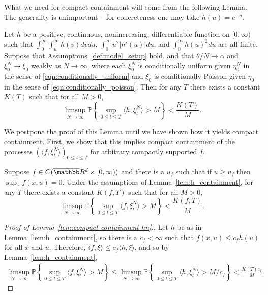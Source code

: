 \documentclass[EJP]{ejpecp} %
\renewcommand{\bar}{\overline}
\newcommand{\IP}{\mathbb P}
\newcommand{\IR}{\mathbb R}
\newcommand{\lp}{\xi}              %
\begin{document}
What we need for compact containment will come from the following Lemma.
The generality is unimportant --
for concreteness one may take $h(u) = e^{-u}$.

\begin{lemma}
        \label{lem:h_containment}
    Let $h$ be a positive, continuous, nonincreasing, differentiable function on $[0, \infty)$
    such that
    $\int_0^\infty \int_u^\infty h(v) dv du$,
    $\int_0^\infty u^2 |h'(u)| du$,
    and $\int_0^\infty h(u)^2 du$
    are all finite.
    Suppose that Assumptions~\ref{def:model_setup} hold,
    and that $\theta/N \to \alpha$ and $\lp_0^N \to \lp_0$ weakly as $N \to \infty$,
    where each $\lp_0^N$ is conditionally uniform given $\eta_0^N$
    in the sense of \eqref{eqn:conditionally_uniform}
    and $\lp_0$ is conditionally Poisson given $\eta_0$
    in the sense of \eqref{eqn:conditionally_poisson}.
    Then for any $T$ there exists a constant $K(T)$ such that for all $M > 0$,
    $$ 
    \limsup_{N \to \infty} \IP\left\{ \sup_{0 \le t \le T} \langle h, \lp^N_t \rangle > M \right\}
    <
    \frac{K(T)}{M} .
    $$
\end{lemma}

We postpone the proof of this Lemma until we have shown how it yields compact containment.
First, we show that this implies compact containment of the processes $(\langle f, \lp^N_t \rangle)_{0 \le t \le T}$
for arbitrary compactly supported $f$.

\begin{lemma}
    \label{lem:compact containment hn}
    Suppose $f \in C(\bar \IR^d \times [0, \infty))$ and there is a $u_f$ such that
    if $u \ge u_f$ then $\sup_x f(x, u) = 0$.
    Under the assumptions of Lemma~\ref{lem:h_containment},
    for any $T$ there exists a constant $K(f,T)$ such that for all $M > 0$,
    $$ 
    \limsup_{N \to \infty} \IP\left\{ \sup_{0 \le t \le T} \langle f, \lp^N_t \rangle > M \right\}
    <
    \frac{K(f,T)}{M} .
    $$
\end{lemma}


\begin{proof}[Proof of Lemma~\ref{lem:compact containment hn}:]
    Let $h$ be as in Lemma~\ref{lem:h_containment},
    so there is a $c_f < \infty$ such that $f(x, u) \le c_f h(u)$ for all $x$ and $u$.
    Therefore, $\langle f, \xi \rangle \le c_f \langle h, \xi \rangle$,
    and so by Lemma~\ref{lem:h_containment},
    \begin{align*}
        \limsup_{N \to \infty} \IP\left\{ \sup_{0 \le t \le T} \langle f, \lp^N_t \rangle > M \right\}
        \le
        \limsup_{N \to \infty} \IP\left\{ \sup_{0 \le t \le T} \langle h, \lp^N_t \rangle > M/c_f \right\}
        <
        \frac{K(T) c_f}{M} .
    \end{align*}
\end{proof}
\end{document}
